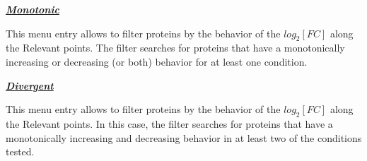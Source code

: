 \textbf{\textit{\underline{Monotonic}}}

This menu entry allows to filter proteins by the behavior of the $log_2[FC]$ along the Relevant points. The filter searches for proteins that have a monotonically increasing or decreasing (or both) behavior for at least one condition. 

\textbf{\textit{\underline{Divergent}}}

This menu entry allows to filter proteins by the behavior of the $log_2[FC]$ along the Relevant points. In this case, the filter searches for proteins that have a monotonically increasing and decreasing behavior in at least two of the conditions tested.




































